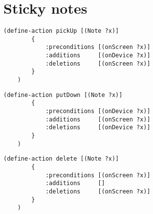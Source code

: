 \section{Sticky notes}

\begin{lstlisting}[caption=pickUp]
    (define-action pickUp [(Note ?x)]
        {
            :preconditions [(onScreen ?x)]
            :additions     [(onDevice ?x)]
            :deletions     [(onScreen ?x)]
        }
    )
\end{lstlisting}

\begin{lstlisting}[caption=putDown]
    (define-action putDown [(Note ?x)]
        {
            :preconditions [(onDevice ?x)]
            :additions     [(onScreen ?x)]
            :deletions     [(onDevice ?x)]
        }
    )
\end{lstlisting}

\begin{lstlisting}[caption=delete]
    (define-action delete [(Note ?x)]
        {
            :preconditions [(onScreen ?x)]
            :additions     []
            :deletions     [(onScreen ?x)]
        }
    )
\end{lstlisting}